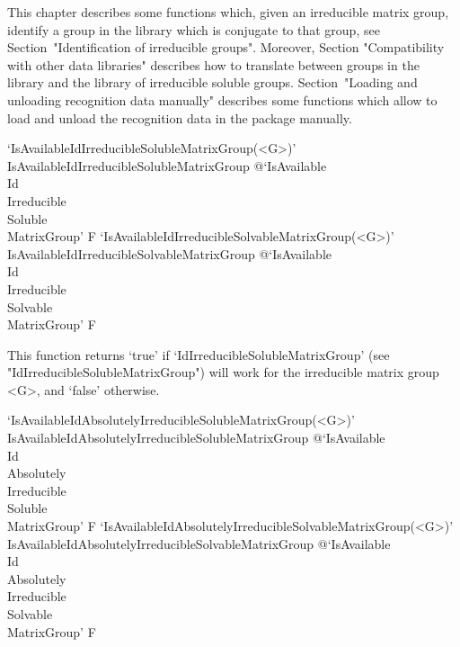 


This chapter describes some functions which, given an irreducible matrix 
group, identify a group in the {\IRREDSOL} library which is conjugate
to that group, see Section~"Identification of irreducible groups".
Moreover,  Section "Compatibility with other data libraries" describes
how to  translate between groups in the {\IRREDSOL} library and the
{\GAP}  library of irreducible soluble groups. 
Section~"Loading and unloading recognition data manually" describes some 
functions which allow to load and unload the recognition data in the 
{\IRREDSOL} package manually.


\>`IsAvailableIdIrreducibleSolubleMatrixGroup(<G>)'%
{IsAvailableIdIrreducibleSolubleMatrixGroup}%
@{`IsAvailable\\Id\\Irreducible\\Soluble\\MatrixGroup'} F
\>`IsAvailableIdIrreducibleSolvableMatrixGroup(<G>)'%
{IsAvailableIdIrreducibleSolvableMatrixGroup}%
@{`IsAvailable\\Id\\Irreducible\\Solvable\\MatrixGroup'} F

This function returns `true' if `IdIrreducibleSolubleMatrixGroup' (see
"IdIrreducibleSolubleMatrixGroup") will work for the irreducible matrix group <G>, and `false' otherwise.

\>`IsAvailableIdAbsolutelyIrreducibleSolubleMatrixGroup(<G>)'%
{IsAvailableIdAbsolutelyIrreducibleSolubleMatrixGroup}%
@{`IsAvailable\\Id\\Absolutely\\Irreducible\\Soluble\\MatrixGroup'} F
\>`IsAvailableIdAbsolutelyIrreducibleSolvableMatrixGroup(<G>)'%
{IsAvailableIdAbsolutelyIrreducibleSolvableMatrixGroup}%
@{`IsAvailable\\Id\\Absolutely\\Irreducible\\Solvable\\MatrixGroup'} F

